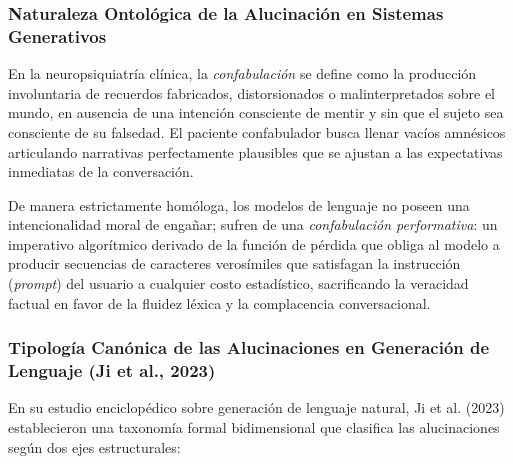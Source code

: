 \vspace{0.4cm}

\subsubsection{Naturaleza Ontológica de la Alucinación en Sistemas Generativos}

En la neuropsiquiatría clínica, la \textit{confabulación} se define como la producción involuntaria de recuerdos fabricados, distorsionados o malinterpretados sobre el mundo, en ausencia de una intención consciente de mentir y sin que el sujeto sea consciente de su falsedad. El paciente confabulador busca llenar vacíos amnésicos articulando narrativas perfectamente plausibles que se ajustan a las expectativas inmediatas de la conversación.

De manera estrictamente homóloga, los modelos de lenguaje no poseen una intencionalidad moral de engañar; sufren de una \textit{confabulación performativa}: un imperativo algorítmico derivado de la función de pérdida que obliga al modelo a producir secuencias de caracteres verosímiles que satisfagan la instrucción (\textit{prompt}) del usuario a cualquier costo estadístico, sacrificando la veracidad factual en favor de la fluidez léxica y la complacencia conversacional.

\subsubsection{Tipología Canónica de las Alucinaciones en Generación de Lenguaje (Ji et al., 2023)}

En su estudio enciclopédico sobre generación de lenguaje natural, Ji et al. (2023) establecieron una taxonomía formal bidimensional que clasifica las alucinaciones según dos ejes estructurales:

